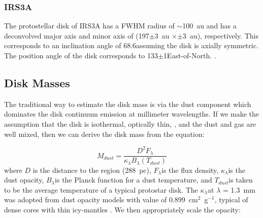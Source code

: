 \documentclass[twocolumn, 12pt]{aastex63}
\renewcommand{\deg}{\degr}
\newcommand{\ab}{$\sim$}
\begin{document}
\subsubsection{IRS3A}
The protostellar disk of IRS3A has a FWHM radius of \ab100~au and has a deconvolved major axis and minor axis of \space(197$\pm$3~au $\times$$\pm$3~au), respectively. This corresponds to an inclination angle of 68.6\deg\space assuming the disk is axially symmetric. The position angle of the disk corresponds to 133$\pm$1\deg\space East-of-North. .

\subsection{Disk Masses}\label{sec:diskmass}
The traditional way to estimate the disk mass is via the dust component which dominates the disk continuum emission at millimeter wavelengths. If we make the assumption that the disk is isothermal, optically thin, , and the dust and gas are well mixed, then we can derive the disk mass from the equation:

\begin{equation}\label{eq:dustmasseq}
    M_{dust} = \frac{D^2 F_{\lambda}}{\kappa_{\lambda}B_{\lambda}(T_{dust})}
\end{equation}
where $D$ is the distance to the region (288~pc), $F_{\lambda}$\space is the flux density, $\kappa_{\lambda}$\space is the dust opacity, $B_{\lambda}$\space is the Planck function for a dust temperature, and $T_{dust}$\space is taken to be the average temperature of a typical protostar disk. The $\kappa_{\lambda}$\space at $\lambda$ = 1.3~mm was adopted from dust opacity models with value of 0.899~cm$^2$~g$^{-1}$, typical of dense cores with thin icy-mantles \citep{1994AA...291..943O}. We then appropriately scale the opacity:
\end{document}
